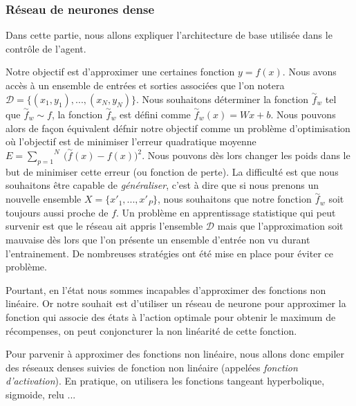 \subsubsection{Réseau de neurones dense}
Dans cette partie, nous allons expliquer l'architecture de base utilisée dans le contrôle de l'agent.

Notre objectif est d'approximer une certaines fonction $y = f(x)$. Nous avons accès à un ensemble de entrées et sorties associées que l'on notera $\mathcal{D} = \bigg\{(x_1, y_1), ..., (x_N, y_N)\bigg\}$. Nous souhaitons déterminer la fonction $\overset{\sim}{f}_w$ tel que $\overset{\sim}{f}_w \sim f$, la fonction $\overset{\sim}{f}_w$ est défini comme $\overset{\sim}{f}_w(x) = Wx + b $. Nous pouvons alors de façon équivalent défnir notre objectif comme un problème d'optimisation où l'objectif est de minimiser l'erreur quadratique moyenne $E = \overset{N}{\underset{p=1}{\sum}}\:\big( \overset{\sim}{f}(x) - f(x) \big)^2$. Nous pouvons dès lors changer les poids dans le but de minimiser cette erreur (ou fonction de perte). La difficulté est que nous souhaitons être capable de \emph{généraliser}, c'est à dire que si nous prenons un nouvelle ensemble $X = \big\{x'_1, ..., x'_P \big\}$, nous souhaitons que notre fonction $\overset{\sim}{f}_w$ soit toujours aussi proche de $f$. Un problème en apprentissage statistique qui peut survenir est que le réseau ait appris l'ensemble $\mathcal{D}$ mais que l'approximation soit mauvaise dès lors que l'on présente un ensemble d'entrée non vu durant l'entrainement. De nombreuses stratégies ont été mise en place pour éviter ce problème.

Pourtant, en l'état nous sommes incapables d'approximer des fonctions non linéaire. Or notre souhait est d'utiliser un réseau de neurone pour approximer la fonction qui associe des états à l'action optimale pour obtenir le maximum de récompenses, on peut conjoncturer la non linéarité de cette fonction.

Pour parvenir à approximer des fonctions non linéaire, nous allons donc empiler des réseaux denses suivies de fonction non linéaire (appelées \emph{fonction d'activation}). En pratique, on utilisera les fonctions tangeant hyperbolique, sigmoide, relu ...

